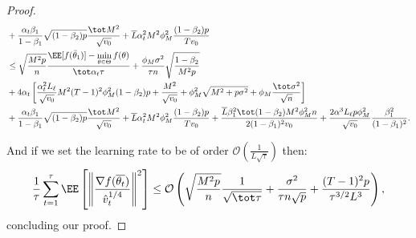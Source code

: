 \documentclass{article}
\begin{document}
\begin{proof}
\begin{align*}
   &  +\frac{\alpha_t \beta_1}{1-\beta_1}  \sqrt{(1-\beta_2)p} \frac{\tot M^2}{\sqrt{v_0}} +\overline{L} \alpha_t^2 M^2 \phi_M^2 \frac{(1-\beta_2)p}{Tv_0} \nonumber\\
   & \leq   \sqrt{\frac{M^2 p}{n}}  \frac{ \EE[f(\bar{\theta}_1)]  - \min \limits_{\theta \in \Theta} f(\theta)}{\tot \alpha_t \tau} +      \frac{\phi_M   \sigma^2}{\tau n} \sqrt{\frac{1 - \beta_2}{M^2 p}  } \nonumber\\
    &   +4\alpha_t \left[ \frac{\alpha_t^2 L_\ell}{\sqrt{v_0}}  M^2 (T-1)^2 \phi_M^2 (1-\beta_2)p + \frac{M^2}{\sqrt{v_0}}+\phi_M^2\sqrt{M^2+p\sigma^2} + \phi_M \frac{\tot \sigma^2}{\sqrt{n}}\right]   \nonumber\\
   &  +\frac{\alpha_t \beta_1}{1-\beta_1}  \sqrt{(1-\beta_2)p} \frac{\tot M^2}{\sqrt{v_0}} +\overline{L} \alpha_t^2 M^2 \phi_M^2 \frac{(1-\beta_2)p}{Tv_0}  + \frac{ \overline{L}\beta_1^2\tot(1-\beta_2)M^2 \phi^2_M n}{2(1-\beta_1)^2 v_0}  +\frac{2\alpha^3 L_\ell p\phi_M^2}{ \sqrt{v_0}}\frac{\beta_1^2}{(1-\beta_1)^2}.
\end{align*}

And if we set the learning rate to be of order $\mathcal{O}(\frac{1}{L \sqrt{\tau}})$ then:
\begin{align*}
    \frac{1}{\tau}\sum_{t=1}^\tau  \EE\left[ \left\| \frac{\nabla f(\overline{\theta_t})}{\hat v_t^{1/4}}   \right \|^2 \right] \leq \mathcal{O}\left( \sqrt{\frac{M^2 p}{n}} \frac{1}{\sqrt{\tot \tau}} + \frac{\sigma^2 }{\tau n\sqrt{p}}+\frac{(T-1)^2p}{\tau^{3/2}L^3}\right),
\end{align*}
concluding our proof.

\end{proof}
\end{document}
